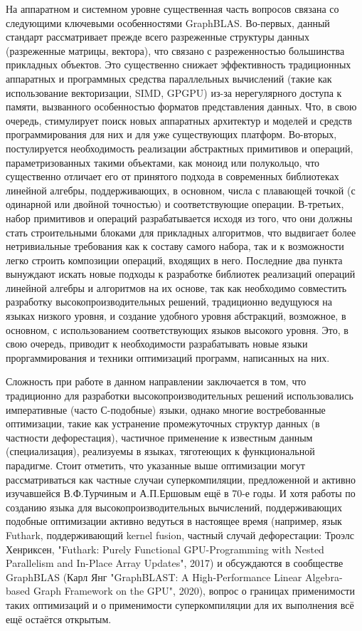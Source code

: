 \documentclass[12pt]{article}  %
\theoremstyle{remark}
\begin{document}
На аппаратном и системном уровне существенная часть вопросов связана со следующими ключевыми особенностями GraphBLAS. Во-первых, данный стандарт рассматривает прежде всего разреженные структуры данных (разреженные матрицы, вектора), что связано с разреженностью большинства прикладных объектов. Это существенно снижает эффективность традиционных аппаратных и программных средства параллельных вычислений (такие как использование векторизации, SIMD, GPGPU) из-за нерегулярного доступа к памяти, вызванного особенностью форматов представления данных. Что, в свою очередь, стимулирует поиск новых аппаратных архитектур и моделей и средств программирования для них и для уже существующих платформ. Во-вторых, постулируется необходимость реализации абстрактных примитивов и операций, параметризованных такими объектами, как моноид или полукольцо, что существенно отличает его от принятого подхода в современных библиотеках линейной алгебры, поддерживающих, в основном, числа с плавающей точкой (с одинарной или двойной точностью) и соответствующие операции. В-третьих, набор примитивов и операций разрабатывается исходя из того, что они должны стать строительными блоками для прикладных алгоритмов, что выдвигает более нетривиальные требования как к составу самого набора, так и к возможности легко строить композиции операций, входящих в него. Последние два пункта вынуждают искать новые подходы к разработке библиотек реализаций операций линейной алгебры и алгоритмов на их основе, так как необходимо совместить разработку высокопроизводительных решений, традиционно ведущуюся на языках низкого уровня, и создание удобного уровня абстракций, возможное, в основном, с использованием соответствующих языков высокого уровня. Это, в свою очередь, приводит к необходимости разрабатывать новые языки проргаммирования и техники оптимизаций программ, написанных на них. 

Сложность при работе в данном направлении заключается в том, что традиционно для разработки высокопроизводительных решений использовались императивные (часто С-подобные) языки, однако многие востребованные оптимизации, такие как устранение промежуточных структур данных (в частности дефорестация), частичное применение к известным данным (специализация), реализуемы в языках, тяготеющих к функциональной парадигме. Стоит отметить, что указанные выше оптимизации могут рассматриваться как частные случаи суперкомпиляции, предложенной и активно изучавшейся В.Ф.Турчиным и А.П.Ершовым ещё в 70-е годы. И хотя работы по созданию языка для высокопроизводительных вычислений, поддерживающих подобные оптимизации активно ведуться в настоящее время (например, язык Futhark, поддерживающий kernel fusion, частный случай дефорестации: Троэлс Хенриксен, "Futhark: Purely Functional GPU-Programming with Nested Parallelism and In-Place Array Updates", 2017) и обсуждаются в сообществе GraphBLAS (Карл Янг "GraphBLAST: A High-Performance Linear Algebra-based Graph Framework on the GPU", 2020), вопрос о границах применимости таких оптимизаций и о применимости суперкомпиляции для их выполнения всё ещё остаётся открытым.
\end{document}
